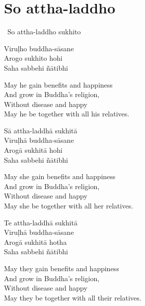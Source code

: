 \suttaRef{[AN 5.36]}

\section{So attha-laddho}
\label{so-attha-laddho}

\begin{pali-leader}
  \anglebracketleft\ \hspace{-0.5mm}So attha-laddho sukhito \hspace{-0.5mm}\anglebracketright\
\end{pali-leader}
\begin{pali-hangtogether}
  Viruḷho buddha-sāsane\\
  Arogo sukhito hohi\\
  Saha sabbehi ñātibhi
\end{pali-hangtogether}

\begin{english-verses}
  May he gain benefits and happiness\\
  And grow in Buddha's religion,\\
  Without disease and happy\\
  May he be together with all his relatives.
\end{english-verses}

\begin{pali-hang}
  Sā attha-laddhā sukhitā\\
  Viruḷhā buddha-sāsane\\
  Arogā sukhitā hohi\\
  Saha sabbehi ñātibhi
\end{pali-hang}

\begin{english-verses}
  May she gain benefits and happiness\\
  And grow in Buddha's religion,\\
  Without disease and happy\\
  May she be together with all her relatives.
\end{english-verses}

\begin{pali-hang}
  Te attha-laddhā sukhitā\\
  Viruḷhā buddha-sāsane\\
  Arogā sukhitā hotha\\
  Saha sabbehi ñātibhi
\end{pali-hang}

\begin{english-verses}
  May they gain benefits and happiness\\
  And grow in Buddha's religion,\\
  Without disease and happy\\
  May they be together with all their relatives.
\end{english-verses}

\suttaRef{[AN 3.155]}

